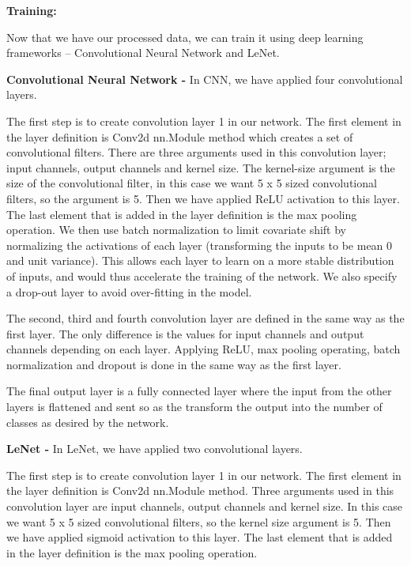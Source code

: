 \documentclass[conference]{IEEEtran}
\begin{document}
\vspace{4mm}
\vfill



\textbf{Training:} 

Now that we have our processed data, we can train it using deep learning frameworks – Convolutional Neural Network and LeNet.

\textbf{Convolutional Neural Network -} In CNN, we have applied four convolutional layers.

The first step is to create convolution layer 1 in our network. The first element in the layer definition is Conv2d nn.Module method which creates a set of convolutional filters. There are three arguments used in this convolution layer; input channels, output channels and kernel size. The kernel-size argument is the size of the convolutional filter, in this case we want 5 x 5 sized convolutional filters, so the argument is 5. Then we have applied ReLU activation to this layer. The last element that is added in the layer definition is the max pooling operation. We then use batch normalization to limit covariate shift by normalizing the activations of each layer (transforming the inputs to be mean 0 and unit variance). This allows each layer to learn on a more stable distribution of inputs, and would thus accelerate the training of the network. We also specify a drop-out layer to avoid over-fitting in the model.

The second, third and fourth convolution layer are defined in the same way as the first layer. The only difference is the values for input channels and output channels depending on each layer. Applying ReLU, max pooling operating, batch normalization and dropout is done in the same way as the first layer.

The final output layer is a fully connected layer where the input from the other layers is flattened and sent so as the transform the output into the number of classes as desired by the network.

\textbf{LeNet -} In LeNet, we have applied two convolutional layers.

The first step is to create convolution layer 1 in our network. The first element in the layer definition is Conv2d nn.Module method. Three arguments used in this convolution layer are input channels, output channels and kernel size. In this case we want 5 x 5 sized convolutional filters, so the kernel size argument is 5. Then we have applied sigmoid activation to this layer. The last element that is added in the layer definition is the max pooling operation. 
\end{document}
